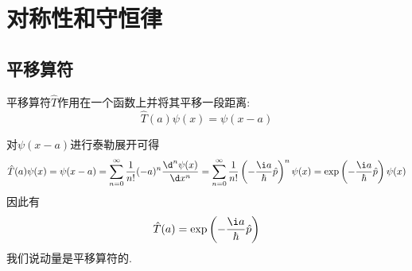 \documentclass{ctexart}
\begin{document}
\section{对称性和守恒律}
\subsection{平移算符}
\begin{definition}[平移算符]
    平移算符$\hat{T}$作用在一个函数上并将其平移一段距离:
    \[\hat{T}(a)\psi(x)=\psi(x-a)\]
\end{definition}
对$\psi(x-a)$进行泰勒展开可得
\[\hat{T}(a)\psi(x)=\psi(x-a)=\sum_{n=0}^{\infty}\dfrac{1}{n!}(-a)^n\dfrac{\d^n\psi(x)}{\d x^n}=\sum_{n=0}^{\infty}\dfrac{1}{n!}\left(-\dfrac{\i a}{\hbar}\hat{p}\right)^n\psi(x)=\exp\left(-\dfrac{\i a}{\hbar}\hat{p}\right)\psi(x)\]
因此有
\[\hat{T}(a)=\exp\left(-\dfrac{\i a}{\hbar}\hat{p}\right)\]
我们说动量是平移算符的.
\end{document}

